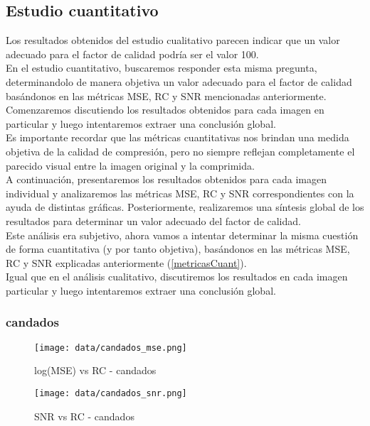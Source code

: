 \documentclass[12pt,a4paper]{article}
\begin{document}
\newpage
\subsection{Estudio cuantitativo}
Los resultados obtenidos del estudio cualitativo parecen indicar que un valor adecuado para el factor de calidad podría ser el valor 100.\\

En el estudio cuantitativo, buscaremos responder esta misma pregunta, determinandolo de manera objetiva un valor adecuado para el factor de calidad basándonos en las métricas MSE, RC y SNR mencionadas anteriormente. Comenzaremos discutiendo los resultados obtenidos para cada imagen en particular y luego intentaremos extraer una conclusión global.\\

Es importante recordar que las métricas cuantitativas nos brindan una medida objetiva de la calidad de compresión, pero no siempre reflejan completamente el parecido visual entre la imagen original y la comprimida.\\ 

A continuación, presentaremos los resultados obtenidos para cada imagen individual y analizaremos las métricas MSE, RC y SNR correspondientes con la ayuda de distintas gráficas. Posteriormente, realizaremos una síntesis global de los resultados para determinar un valor adecuado del factor de calidad.\\

Este análisis era subjetivo, ahora vamos a intentar determinar la misma cuestión de forma cuantitativa (y por tanto objetiva), basándonos en las métricas MSE, RC y SNR explicadas anteriormente (\ref{metricasCuant}). \\

Igual que en el análisis cualitativo, discutiremos los resultados en cada imagen particular y luego intentaremos extraer una conclusión global.\\

\subsubsection{candados}
\begin{minipage}{0.5\textwidth}
        \centering
        \begin{figure}[H]
        \centering
        \texttt{[image: data/candados\_mse.png]}
        \caption{log(MSE) vs RC - candados}
        \end{figure}
        \end{minipage}\hfill
        \begin{minipage}{0.5\textwidth}
         \begin{figure}[H]
        \centering
        \texttt{[image: data/candados\_snr.png]}
        \caption{SNR vs RC - candados}
        
        \end{figure}   
\end{minipage}
    
\end{document}

